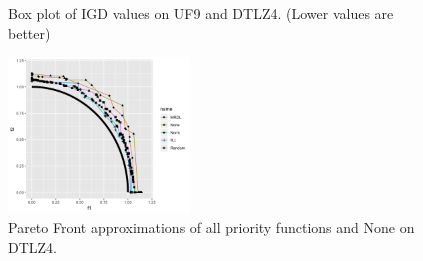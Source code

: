 \begin{figure}[!t]
\begin{subfigure}[b]{0.33\textwidth}
	\end{subfigure}
	\caption{Box plot of IGD values on UF9 and DTLZ4. (Lower values are better)}
		\label{IGDS}
\end{figure}


%
%

\begin{figure}[!t]

	\centering
	\includegraphics[width=0.43\textwidth, height=0.33\textwidth]{images/Pareto-front-dtlz4.png}
	\caption{Pareto Front approximations of all priority functions and None on DTLZ4.}
	\label{PFs}

\end{figure}

